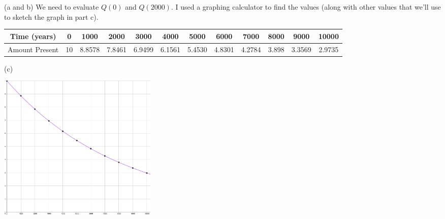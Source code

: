\documentclass[12pt]{letter}
\newcommand{\?}{\stackrel{?}{=}}
\begin{document}
	(a and b) We need to evaluate $Q(0)$ and $Q(2000)$. I used a graphing calculator to find the values (along with other values that we'll use to sketch the graph in part c).
	
	\begin{tabular}{c|ccccccccccc}
		Time (years) & 0 & 1000 & 2000 & 3000 & 4000 & 5000 & 6000 & 7000 & 8000 & 9000 & 10000 \\ \hline
		Amount Present & 10 & 8.8578 & 7.8461 & 6.9499 & 6.1561 & 5.4530 & 4.8301 & 4.2784 & 3.898 & 3.3569 & 2.9735
	\end{tabular}

	(c)
	
	\includegraphics[width=3in]{5164c.png}
	
	\vfill %
	
	
	
\end{document}
